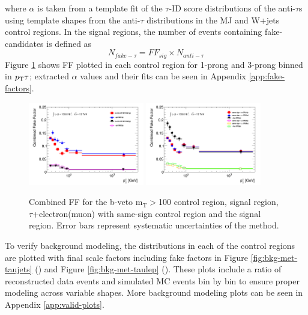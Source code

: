		where $\alpha$ is taken from a template fit of the $\tau$-ID score distributions of the anti-$\tau$s using template shapes from the anti-$\tau$ distributions in the MJ and W+jets control regions. In the signal regions, the number of events containing fake-\tauhad candidates is defined as
		\begin{equation}\label{eqn:nfakethad}
			N_{fake-\tau} = FF_{sig} \times N_{anti-\tau} 
		\end{equation}
		Figure \ref{fig:FF_COM} shows \gls{FF} plotted in each control region for 1-prong and 3-prong \tauhad binned in $p_{\text{T}}{\tau}$; extracted $\alpha$ values and their fits can be seen in Appendix \ref{app:fake-factors}.
		\begin{figure}[h!]
		  \begin{center}
		    \includegraphics[width=0.45\textwidth]{chapters/chapter6_HPlus/images/FFs/FFs_COM_inclusive__taujet.png} \qquad
		    \includegraphics[width=0.45\textwidth]{chapters/chapter6_HPlus/images/FFs/FFs_COM_inclusive__taulep.png} 
		  \end{center}
		  \caption{
		Combined \gls{FF} for the \taujets b-veto $\mathrm{m_{T}}>$100 control region, \taujets signal region, $\tau$+electron(muon) with same-sign control region and the \taulep signal region. Error bars represent systematic uncertainties of the method. 
		}
		  \label{fig:FF_COM}
		\end{figure}


		To verify background modeling, the \Etm distributions in each of the control regions are plotted with final scale factors including fake factors in Figure \ref{fig:bkg-met-taujets} (\taujets) and Figure \ref{fig:bkg-met-taulep} (\taulep). These plots include a ratio of reconstructed data events and simulated \gls{MC} events bin by bin to ensure proper modeling across variable shapes. More background modeling plots can be seen in Appendix \ref{app:valid-plots}.

